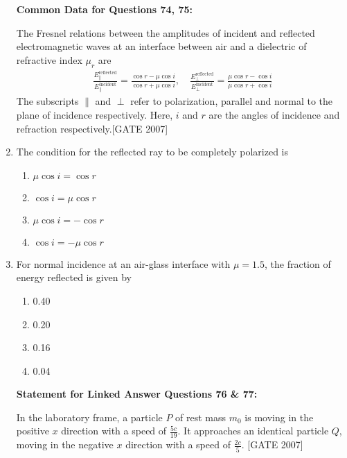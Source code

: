 \documentclass[journal,12pt,onecolumn]{IEEEtran}
\theoremstyle{remark}
\begin{document}
\begin{enumerate}
\textbf{Common Data for Questions 74, 75:}

The Fresnel relations between the amplitudes of incident and reflected electromagnetic waves at an interface between air and a dielectric of refractive index $\mu_r$ are   
\begin{align*}
    \frac{E_{\parallel}^{\text{reflected}}}{E_{\parallel}^{\text{incident}}} = \frac{\cos r - \mu \cos i}{\cos r + \mu \cos i}, \quad \frac{E_{\perp}^{\text{reflected}}}{E_{\perp}^{\text{incident}}} = \frac{\mu \cos r - \cos i}{\mu \cos r + \cos i}
\end{align*}
The subscripts $\parallel$ and $\perp$ refer to polarization, parallel and normal to the plane of incidence respectively. Here, $i$ and $r$ are the angles of incidence and refraction respectively.\hfill{[GATE 2007]}


    \item  The condition for the reflected ray to be completely polarized is
    \begin{multicols}{2}
    \begin{enumerate}
        \item $\mu \cos i = \cos r$
        \item $\cos i = \mu \cos r$
        \item $\mu \cos i = - \cos r$
        \item $\cos i = - \mu \cos r$
    \end{enumerate}
    \end{multicols}

    \item  For normal incidence at an air-glass interface with $\mu = 1.5$, the fraction of energy reflected is given by
    \begin{multicols}{4}
    \begin{enumerate}
        \item 0.40
        \item 0.20
        \item 0.16
        \item 0.04
    \end{enumerate}
    \end{multicols}



\textbf{Statement for Linked Answer Questions 76 \& 77:}

In the laboratory frame, a particle $P$ of rest mass $m_0$ is moving in the positive $x$ direction with a speed of $\frac{5c}{19}$. It approaches an identical particle $Q$, moving in the negative $x$ direction with a speed of $\frac{2c}{5}$.  \hfill{[GATE 2007]}


\end{enumerate}
\end{document}
